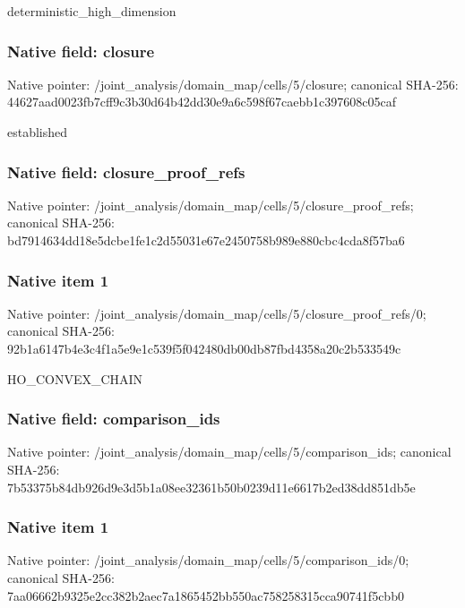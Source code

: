 \documentclass[10pt,a4paper]{article}
\begin{document}
\begingroup\raggedright\sloppy deterministic\_\allowbreak{}high\_\allowbreak{}dimension\par\endgroup

\subsubsection{Native field: closure}
Native pointer: /joint\_\allowbreak{}analysis/domain\_\allowbreak{}map/cells/5/closure; canonical SHA-256: 44627aad0023fb7cff9c3b30d64b42dd30e9a6c598f67caebb1c397608c05caf

\begingroup\raggedright\sloppy established\par\endgroup

\subsubsection{Native field: closure\_\allowbreak{}proof\_\allowbreak{}refs}
Native pointer: /joint\_\allowbreak{}analysis/domain\_\allowbreak{}map/cells/5/closure\_\allowbreak{}proof\_\allowbreak{}refs; canonical SHA-256: bd7914634dd18e5dcbe1fe1c2d55031e67e2450758b989e880cbc4cda8f57ba6

\subsubsection{Native item 1}
Native pointer: /joint\_\allowbreak{}analysis/domain\_\allowbreak{}map/cells/5/closure\_\allowbreak{}proof\_\allowbreak{}refs/0; canonical SHA-256: 92b1a6147b4e3c4f1a5e9e1c539f5f042480db00db87fbd4358a20c2b533549c

\begingroup\raggedright\sloppy HO\_\allowbreak{}CONVEX\_\allowbreak{}CHAIN\par\endgroup

\subsubsection{Native field: comparison\_\allowbreak{}ids}
Native pointer: /joint\_\allowbreak{}analysis/domain\_\allowbreak{}map/cells/5/comparison\_\allowbreak{}ids; canonical SHA-256: 7b53375b84db926d9e3d5b1a08ee32361b50b0239d11e6617b2ed38dd851db5e

\subsubsection{Native item 1}
Native pointer: /joint\_\allowbreak{}analysis/domain\_\allowbreak{}map/cells/5/comparison\_\allowbreak{}ids/0; canonical SHA-256: 7aa06662b9325e2cc382b2aec7a1865452bb550ac758258315cca90741f5cbb0
\end{document}
